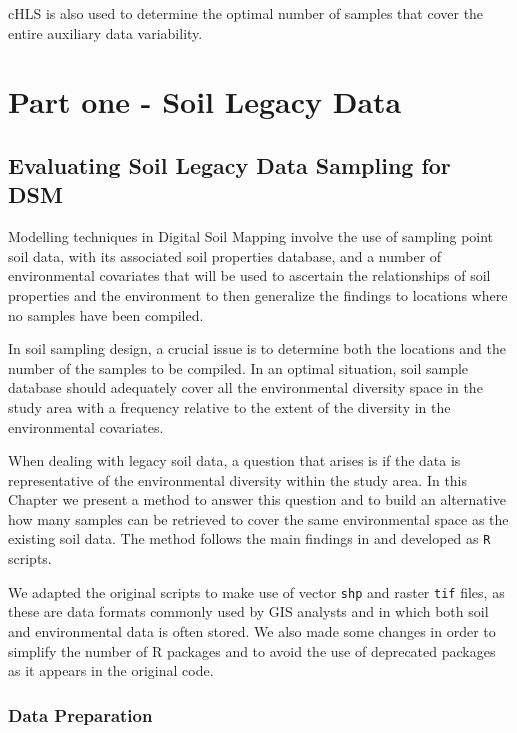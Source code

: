 \documentclass[
]{book}
\begin{document}
cHLS is also used to determine the optimal number of samples that cover the entire auxiliary data variability.

\hypertarget{part-part-one---soil-legacy-data}{%
\part*{Part one - Soil Legacy Data}\label{part-part-one---soil-legacy-data}}

\hypertarget{legacy_data}{%
\chapter{Evaluating Soil Legacy Data Sampling for DSM}\label{legacy_data}}

Modelling techniques in Digital Soil Mapping involve the use of sampling point soil data, with its associated soil properties database, and a number of environmental covariates that will be used to ascertain the relationships of soil properties and the environment to then generalize the findings to locations where no samples have been compiled.

In soil sampling design, a crucial issue is to determine both the locations and the number of the samples to be compiled. In an optimal situation, soil sample database should adequately cover all the environmental diversity space in the study area with a frequency relative to the extent of the diversity in the environmental covariates.

When dealing with legacy soil data, a question that arises is if the data is representative of the environmental diversity within the study area. In this Chapter we present a method to answer this question and to build an alternative how many samples can be retrieved to cover the same environmental space as the existing soil data. The method follows the main findings in \citep{Malone} and developed as \texttt{R} scripts.

We adapted the original scripts to make use of vector \texttt{shp} and raster \texttt{tif} files, as these are data formats commonly used by GIS analysts and in which both soil and environmental data is often stored. We also made some changes in order to simplify the number of R packages and to avoid the use of deprecated packages as it appears in the original code.

\hypertarget{data-preparation}{%
\section{Data Preparation}\label{data-preparation}}
\end{document}
